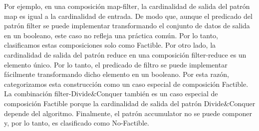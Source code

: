Por ejemplo, en una composición map-filter, la cardinalidad de salida del patrón map es igual a la cardinalidad de entrada. De modo que, aunque el predicado del patrón filter se puede implementar transformando el conjunto de datos de salida en un booleano, este caso no refleja una práctica común. Por lo tanto, clasificamos estas composiciones solo como Factible. Por otro lado, la cardinalidad de salida del patrón reduce en una composición filter-reduce es un elemento único. Por lo tanto, el predicado de filtro se puede implementar fácilmente transformando dicho elemento en un booleano. Por esta razón, categorizamos esta construcción como un caso especial de composición Factible. La combinación filter-Divide\&Conquer también es un caso especial de composición Factible porque la cardinalidad de salida del patrón Divide\&Conquer depende del algoritmo. Finalmente, el patrón accumulator no se puede componer y, por lo tanto, es clasificado como No-Factible.





